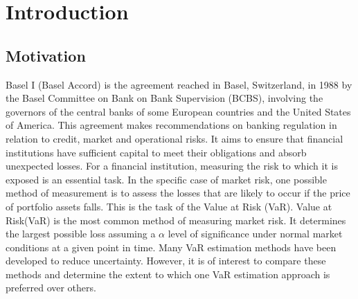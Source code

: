 \documentclass[a4paper,11pt,oneside]{book}
\begin{document}
	
	
	
	\tableofcontents
	



\chapter{Introduction}




\section{Motivation}

Basel I (Basel Accord) is the agreement reached in Basel, Switzerland, in 1988 by the Basel Committee on Bank
on Bank Supervision (BCBS), involving the governors of the central banks of some European countries and the United States of America. This agreement makes recommendations on banking regulation in relation to credit, market and operational risks. It aims to ensure that financial institutions have sufficient capital to meet their obligations and absorb unexpected losses. \newline\newline
For a financial institution, measuring the risk to which it is exposed is an essential task. In the specific case of market risk, one possible method of measurement is to assess the losses that are likely to occur if the price of portfolio assets falls. This is the task of the Value at Risk
(VaR).
Value at Risk(VaR) is the most common method of measuring market risk. It determines the largest possible loss assuming a $\alpha$ level of significance under normal market conditions at a given point in time.\newline\newline
Many VaR estimation methods have been developed to reduce uncertainty. However, it is of interest to compare these methods and determine the extent to which one VaR estimation approach is preferred over others.
\end{document}
